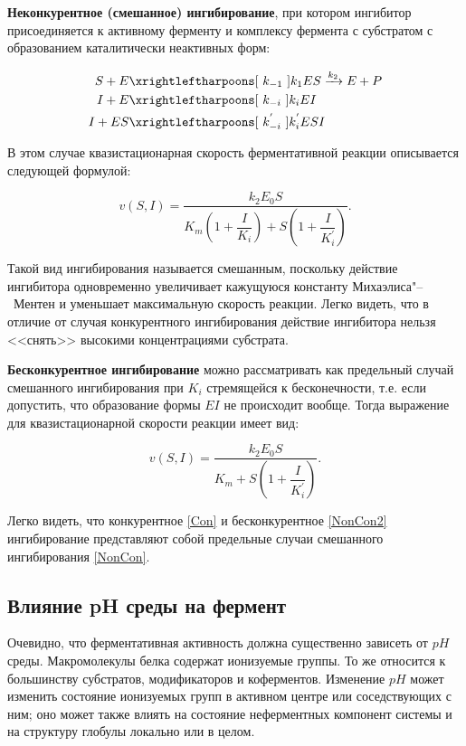 \documentclass[12pt,a4paper,oneside]{book}
\begin{document}
\textbf{Неконкурентное (смешанное) ингибирование}, при котором ингибитор присоединяется к активному ферменту и комплексу фермента с субстратом с образованием каталитически неактивных форм:

\begin{align}
 S + E & \xrightleftharpoons [~k_{-1}~] {k_1}  ES \xrightarrow {k_2} E + P \\ 
 I + E & \xrightleftharpoons [~k_{-i}~] {k_i} EI  \nonumber \\
 I + ES & \xrightleftharpoons [~k_{-i}^{'}~] {k_i^{'}} ESI \nonumber
\end{align}

В этом случае квазистационарная скорость ферментативной реакции описывается следующей формулой:

\begin{equation}
\label{NonCon} 
v(S, I) = \dfrac{k_2 E_0 S}{K_m \left(1 + \dfrac{I}{K_i} \right)+ S \left( 1 + \dfrac{I}{K_i^{'}} \right) } .
\end{equation}

Такой вид ингибирования называется смешанным, поскольку действие ингибитора одновременно увеличивает кажущуюся константу Михаэлиса"--~Ментен и уменьшает максимальную скорость реакции. Легко видеть, что в отличие от случая конкурентного ингибирования действие ингибитора нельзя <<снять>> высокими концентрациями субстрата. 

\textbf{Бесконкурентное ингибирование} можно рассматривать как предельный случай смешанного ингибирования при $ K_i $ стремящейся к бесконечности, т.е. если допустить, что образование формы $ EI $ не происходит вообще. Тогда выражение для квазистационарной скорости реакции имеет вид:

\begin{equation}
\label{NonCon2} 
v(S, I) = \dfrac{k_2 E_0 S}{K_m + S \left( 1 + \dfrac{I}{K_i^{'}} \right) } .
\end{equation}

Легко видеть, что конкурентное \ref{Con} и бесконкурентное \ref{NonCon2} ингибирование представляют собой предельные случаи смешанного ингибирования \ref{NonCon}. 


\subsection{Влияние pH среды на фермент}

Очевидно, что ферментативная активность должна существенно зависеть от $pH$ среды. Макромолекулы белка содержат ионизуемые группы. То же относится к большинству субстратов, модификаторов и коферментов. Изменение $pH$ может изменить состояние ионизуемых групп в активном центре или соседствующих с ним; оно может также влиять на состояние неферментных компонент системы и на структуру глобулы локально или в целом.
\end{document}
